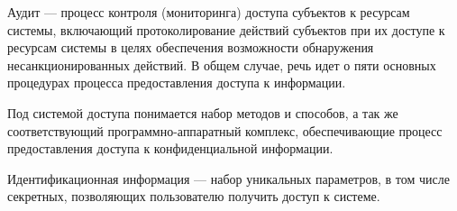 Аудит --- процесс контроля (мониторинга) доступа субъектов к ресурсам системы,
включающий протоколирование действий субъектов при их доступе к ресурсам системы
в целях обеспечения возможности обнаружения несанкционированных действий.
В общем случае, речь идет о пяти основных процедурах процесса
предоставления доступа к информации.

Под системой доступа понимается набор методов и способов, а так же
соответствующий программно-аппаратный комплекс, обеспечивающие процесс
предоставления доступа к конфиденциальной информации.

Идентификационная информация --- набор уникальных параметров, в том числе
секретных, позволяющих пользователю получить доступ к системе.
%
%

\actualitysection
\actualitytext

\objectsection
\objecttext

\subjectsection
\subjecttext

\objectivesection
\objectivetext

\noveltysection
\noveltytext

{}

\resultssection
\resultstext

\approbationsection
\approbationtext

\pubsection
\pubtext

\contribsection
\contribtext

\structsection
\structtext
